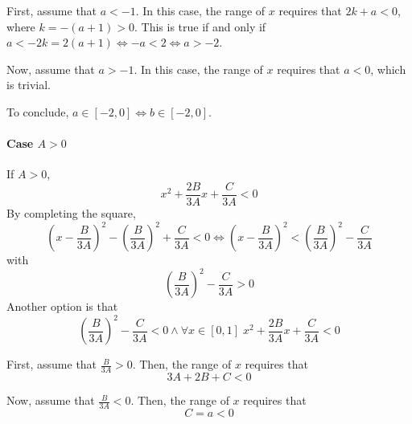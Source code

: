\documentclass[a4paper, 11pt]{scrartcl}
\begin{document}
First, assume that $a < -1$. In this case, the range of $x$ requires that $2k + a < 0$, where $k = -(a + 1) > 0$. This is true if and only if $a < -2k = 2(a + 1) \iff -a < 2 \iff a > -2$.

Now, assume that $a > -1$. In this case, the range of $x$ requires that $a < 0$, which is trivial.

To conclude, $a\in[-2, 0] \iff b\in[-2, 0]$.


\paragraph{Case $A>0$}
If $A>0$,
\[
x^2 +\frac{2B}{3A}x + \frac{C}{3A} < 0
\]
By completing the square,
\[
 \left(x - \frac{B}{3A}\right)^2 - \left(\frac{B}{3A}\right)^2 + \frac{C}{3A} < 0 \iff \left(x - \frac{B}{3A}\right)^2  < \left(\frac{B}{3A}\right)^2 - \frac{C}{3A}
\]
with
\[
\left(\frac{B}{3A}\right)^2 - \frac{C}{3A} > 0
\]
Another option is that
\[
\left(\frac{B}{3A}\right)^2 - \frac{C}{3A} < 0 \land \forall x\in[0, 1]\;x^2 +\frac{2B}{3A}x + \frac{C}{3A} < 0
\]

First, assume that $\frac{B}{3A} > 0$. Then, the range of $x$ requires that
\[
3A + 2B + C < 0
\]

Now, assume that $\frac{B}{3A} < 0$. Then, the range of $x$ requires that
\[
 C = a < 0
\]
\end{document}
